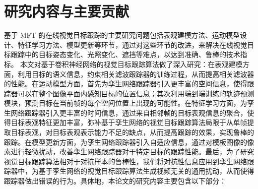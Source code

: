 \section{研究内容与主要贡献}
基于 MFT 的在线视觉目标跟踪的主要研究问题包括表观建模方法、运动模型设计、特征学习方法、模型更新等环节，通过对这些环节的改进，来解决在线视觉目标跟踪中的目标姿态变化、光照变化、遮挡等难点，以达到准确、鲁棒的技术指标。
本文对基于卷积神经网络的视觉目标跟踪算法做了深入研究：在表观建模方面，利用目标的语义信息，约束相关滤波跟踪器的训练过程，从而提高相关滤波器的性能。在运动模型方面，首先为孪生网络跟踪器引入更丰富的空间信息，使得跟踪器可以在整个图像平面内感知目标的位置信息；其次利用端到端训练的轨迹预测模块，预测目标在当前帧的每个空间位置上出现的可能性。在特征学习方面，为孪生网络跟踪器引入更丰富的时间信息，通过来自相邻帧的目标表观信息的聚合，使得目标表观特征更加丰富，弥补基于孪生网络的视觉目标跟踪算法局限于从单帧提取目标表观，对目标表观表示能力不足的缺点，从而提高跟踪的效果，实现鲁棒的跟踪。在模型更新方面，为孪生网络跟踪器引入自适应信息，通过对模板图像的像素进行轻微扰动，改善孪生网络跟踪器对于特定目标的跟踪性能。最后，为了研究视觉目标跟踪算法相对于对抗样本的鲁棒性，我们将对抗性信息应用到孪生网络跟踪器中，为基于孪生网络的视觉目标跟踪算法生成视频无关的通用扰动，从而使得跟踪器做出错误的行为。具体地，本论文的研究内容主要包含以下部分：
